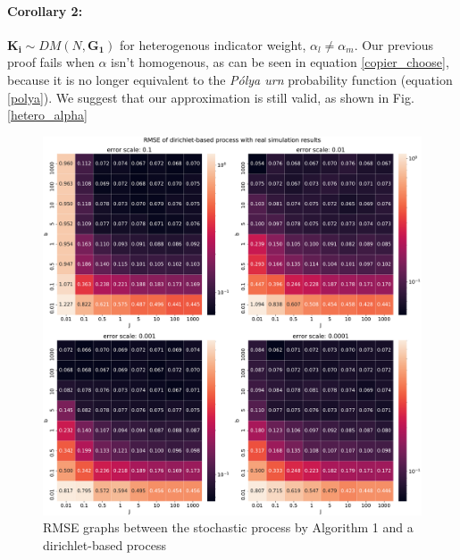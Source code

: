 \documentclass[11pt]{article}
\let\vec\mathbf
\begin{document}
\paragraph{Corollary 2:} $\vec{K_i} \sim DM(N,\vec{G_1})$ for heterogenous indicator weight, $\alpha_l \ne \alpha_m$.
Our previous proof fails when $\alpha$ isn't homogenous, as can be seen in equation \ref{copier_choose}, because it is no longer equivalent to the \textit{Pólya urn} probability function (equation \ref{polya}).
We suggest that our approximation is still valid, as shown in Fig. \ref{hetero_alpha}

\begin{figure}
    \includegraphics[width=\linewidth]{dirichlet_rmse_heatmap.pdf}
    \caption{RMSE graphs between the stochastic process by Algorithm 1 and a dirichlet-based process}
    \label{dirichlet_rmse}
\end{figure}



\clearpage


\end{document}
